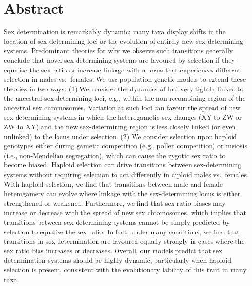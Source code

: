 \documentclass[10pt,letterpaper]{article}
\begin{document}
\section*{Abstract}
Sex determination is remarkably dynamic; many taxa display shifts in the location of sex-determining loci or the evolution of entirely new sex-determining systems. 
Predominant theories for why we observe such transitions generally conclude that novel sex-determining systems are favoured by selection if they equalise the sex ratio or increase linkage with a locus that experiences different selection in males vs.\ females. 
We use population genetic models to extend these theories in two ways: 
(1) We consider the dynamics of loci very tightly linked to the ancestral sex-determining loci, e.g., within the non-recombining region of the ancestral sex chromosomes. 
Variation at such loci can favour the spread of new sex-determining systems in which the heterogametic sex changes (XY to ZW or ZW to XY) and the new sex-determining region is less closely linked (or even unlinked) to the locus under selection. 
(2) We consider selection upon haploid genotypes either during gametic competition (e.g., pollen competition) or meiosis (i.e., non-Mendelian segregation), which can cause the zygotic sex ratio to become biased. 
Haploid selection can drive transitions between sex-determining systems without requiring selection to act differently in diploid males vs.\ females. 
With haploid selection, we find that transitions between male and female heterogamety can evolve where linkage with the sex-determining locus is either strengthened or weakened. 
Furthermore, we find that sex-ratio biases may increase or decrease with the spread of new sex chromosomes, which implies that transitions between sex-determining systems cannot be simply predicted by selection to equalise the sex ratio.
In fact, under many conditions, we find that transitions in sex determination are favoured equally strongly in cases where the sex ratio bias increases or decreases.
Overall, our models predict that sex determination systems should be highly dynamic, particularly when haploid selection is present, consistent with the evolutionary lability of this trait in many taxa.


\end{document}
